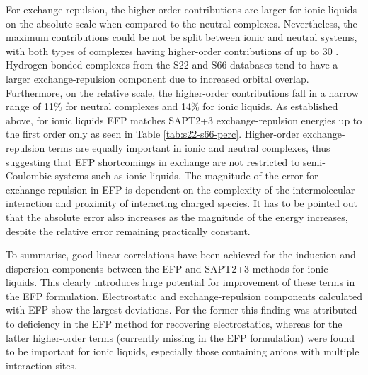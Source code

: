 For exchange-repulsion, the higher-order contributions are larger for ionic liquids on the absolute scale when compared to the neutral complexes.
Nevertheless, the maximum contributions could be not be split between ionic and neutral systems, with both types of complexes having higher-order contributions of up to 30 \enUnit.
Hydrogen-bonded complexes from the S22 and S66 databases tend to have a larger exchange-repulsion component due to increased orbital overlap.
Furthermore, on the relative scale, the higher-order contributions fall in a narrow range of 11\% for neutral complexes and 14\% for ionic liquids.
As established above, for ionic liquids EFP matches SAPT2+3 exchange-repulsion energies up to the first order only as seen in Table \ref{tab:s22-s66-perc}.
Higher-order exchange-repulsion terms are equally important in ionic and neutral complexes, thus suggesting that EFP shortcomings in exchange are not restricted to semi-Coulombic systems such as ionic liquids.
The magnitude of the error for exchange-repulsion in EFP is dependent on the complexity of the intermolecular interaction and proximity of interacting charged species. 
It has to be pointed out that the absolute error also increases as the magnitude of the energy increases, despite the relative error remaining practically constant.

To summarise, good linear correlations have been achieved for the induction and dispersion components between the EFP and SAPT2+3 methods for ionic liquids. This clearly introduces huge potential for improvement of these terms in the EFP formulation. Electrostatic and exchange-repulsion components calculated with EFP show the largest deviations. For the former this finding was attributed to deficiency in the EFP method for recovering electrostatics, whereas for the latter higher-order terms (currently missing in the EFP formulation) were found to be important for ionic liquids, especially those containing anions with multiple interaction sites.   

